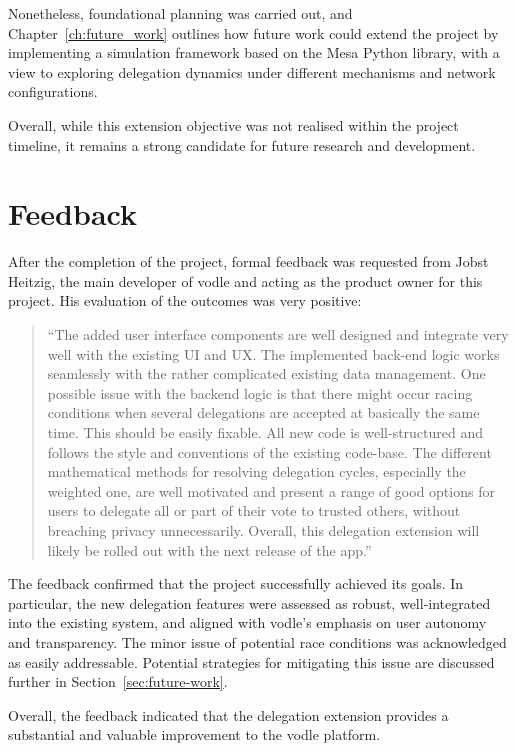Nonetheless, foundational planning was carried out, and Chapter~\ref{ch:future_work} outlines how future work could extend the project by implementing a simulation framework based on the Mesa Python library, with a view to exploring delegation dynamics under different mechanisms and network configurations.

Overall, while this extension objective was not realised within the project timeline, it remains a strong candidate for future research and development.


\section{Feedback}
\label{sec:feedback}

After the completion of the project, formal feedback was requested from Jobst Heitzig, the main developer of vodle and acting as the product owner for this project. His evaluation of the outcomes was very positive:

\begin{quote}
    ``The added user interface components are well designed and integrate very well with the existing UI and UX. The implemented back-end logic works seamlessly with the rather complicated existing data management. One possible issue with the backend logic is that there might occur racing conditions when several delegations are accepted at basically the same time. This should be easily fixable. All new code is well-structured and follows the style and conventions of the existing code-base. The different mathematical methods for resolving delegation cycles, especially the weighted one, are well motivated and present a range of good options for users to delegate all or part of their vote to trusted others, without breaching privacy unnecessarily. Overall, this delegation extension will likely be rolled out with the next release of the app.''
\end{quote}

The feedback confirmed that the project successfully achieved its goals. In particular, the new delegation features were assessed as robust, well-integrated into the existing system, and aligned with vodle's emphasis on user autonomy and transparency. The minor issue of potential race conditions was acknowledged as easily addressable. Potential strategies for mitigating this issue are discussed further in Section~\ref{sec:future-work}.

Overall, the feedback indicated that the delegation extension provides a substantial and valuable improvement to the vodle platform.